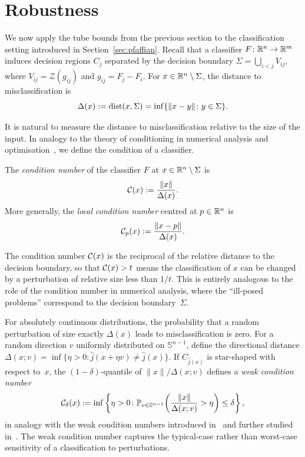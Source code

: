 \section{Robustness}\label{sec:robustness}
We now apply the tube bounds from the previous section to the classification setting introduced in Section~\ref{sec:pfaffian}. Recall that a classifier $F\colon \mathbb{R}^n \to \mathbb{R}^m$ induces decision regions $C_j$ separated by the decision boundary $\Sigma = \bigcup_{i<j} V_{ij}$, where $V_{ij} = \mathcal{Z}(g_{ij})$ and $g_{ij} = F_j - F_i$. For $x\in \mathbb{R}^n\setminus \Sigma$, the distance to misclassification is
\begin{equation*}
  \Delta(x) := \operatorname{dist}(x, \Sigma) = \inf\{\|x - y\| \colon y \in \Sigma\}.
\end{equation*}

It is natural to measure the distance to misclassification relative to the size of the input. In analogy to the theory of conditioning in numerical analysis and optimisation~\cite{burgisser2013condition}, we define the condition of a classifier.

\begin{definition}\label{def:condition}
The \emph{condition number} of the classifier $F$ at $x\in \mathbb{R}^n\setminus \Sigma$ is
\begin{equation*}
  \mathcal{C}(x) := \frac{\|x\|}{\Delta(x)}.
\end{equation*}
More generally, the \emph{local condition number} centred at $p\in \mathbb{R}^n$ is
\begin{equation*}
  \mathcal{C}_p(x) := \frac{\|x - p\|}{\Delta(x)}.
\end{equation*}
\end{definition}

The condition number $\mathcal{C}(x)$ is the reciprocal of the relative distance to the decision boundary, so that $\mathcal{C}(x) > t$ means the classification of $x$ can be changed by a perturbation of relative size less than $1/t$. This is entirely analogous to the role of the condition number in numerical analysis, where the ``ill-posed problems'' correspond to the decision boundary~$\Sigma$.

\begin{remark}\label{rem:weak-condition}
For absolutely continuous distributions, the probability that a random perturbation of size exactly $\Delta(x)$ leads to misclassification is zero. For a random direction $v$ uniformly distributed on $\mathbb{S}^{n-1}$, define the directional distance $\Delta(x;v) = \inf\{\eta > 0 \colon \hat{j}(x+\eta v) \neq \hat{j}(x)\}$. If $C_{\hat{j}(x)}$ is star-shaped with respect to~$x$, the $(1-\delta)$-quantile of $\|x\|/\Delta(x;v)$ defines a \emph{weak condition number}
\begin{equation*}
  \mathcal{C}_\delta(x) := \inf\left\{\eta > 0 \colon \mathbb{P}_{v\in \mathbb{S}^{n-1}}\!\left(\frac{\|x\|}{\Delta(x;v)} > \eta\right) \leq \delta\right\},
\end{equation*}
in analogy with the weak condition numbers introduced in~\cite{lotz2020weak} and further studied in~\cite{burgisser2013condition}. The weak condition number captures the typical-case rather than worst-case sensitivity of a classification to perturbations.
\end{remark}


